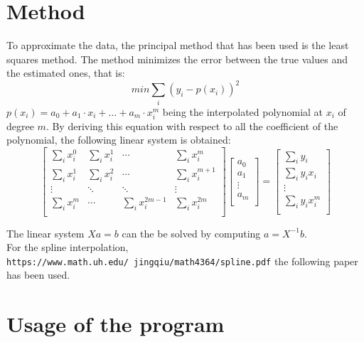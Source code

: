\documentclass[12pt]{article}
\begin{document}
 \section{Method}
 To approximate the data, the principal method that has been used is the least squares method. The method minimizes the error between the true values and the estimated ones, that is:
 \begin{equation}
 min \sum_i (y_i - p(x_i))^2
 \end{equation}
 $p(x_i) = a_0 + a_1\cdot x_i+ \ldots +a_m\cdot x_i^m$ being the interpolated polynomial at $x_i$ of degree $m$.
 By deriving this equation with respect to all the coefficient of the polynomial, the following linear system is obtained:
 \begin{equation}
\left[ \begin{array}{cccc}
\sum_i x_i^0 & \sum_i x_i^1 & \cdots & \sum_i x_i^m \\
\sum_i x_i^1 & \sum_i x_i^2 & \cdots & \sum_i x_i^{m+1} \\
\vdots & \ddots & \ddots & \vdots \\
\sum_i x_i^m& \cdots & \sum_i x_i^{2m-1} & \sum_i x_i^{2m}\\
\end{array} \right]
\left[ \begin{array}{c}
a_0 \\
a_1\\
\vdots\\
a_m\\
\end{array} \right] = 
\left[ \begin{array}{c}
\sum_i y_i  \\
\sum_i y_i x_i\\
\vdots\\
\sum_i y_i x_i^m\\
\end{array} \right]
\end{equation}
 
The linear system $Xa=b$ can the be solved by computing $a = X^{-1}b$.\\
For the spline interpolation, \texttt{https://www.math.uh.edu/~jingqiu/math4364/spline.pdf} the following paper has been used.
 
\section{Usage of the program}
\end{document}
